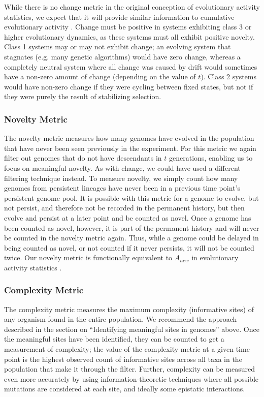 \documentclass[letterpaper]{article}
\begin{document}
While there is no change metric in the original conception of evolutionary activity statistics, we expect that it will provide similar information to cumulative evolutionary activity \citep{bedau_comparison_1997}. Change must be positive in systems exhibiting class 3 or higher evolutionary dynamics, as these systems must all exhibit positive novelty. Class 1 systems may or may not exhibit change; an evolving system that stagnates (e.g. many genetic algorithms) would have zero change, whereas a completely neutral system where all change was caused by drift would sometimes have a non-zero amount of change (depending on the value of $t$). Class 2 systems would have non-zero change if they were cycling between fixed states, but not if they were purely the result of stabilizing selection.

\subsubsection{Novelty Metric}
The novelty metric measures how many genomes have evolved in the population that have never been seen previously in the experiment. For this metric we again filter out genomes that do not have descendants in $t$ generations, enabling us to focus on meaningful novelty. As with change, we could have used a different filtering technique instead. To measure novelty, we simply count how many genomes from persistent lineages have never been in a previous time point’s persistent genome pool. It is possible with this metric for a genome to evolve, but not persist, and therefore not be recorded in the permanent history, but then evolve and persist at a later point and be counted as novel. Once a genome has been counted as novel, however, it is part of the permanent history and will never be counted in the novelty metric again. Thus, while a genome could be delayed in being counted as novel, or not counted if it never persists, it will not be counted twice. Our novelty metric is functionally equivalent to $A_{new}$ in evolutionary activity statistics \citep{bedau_comparison_1997}.    

\subsubsection{Complexity Metric}
The complexity metric measures the maximum complexity (informative sites) of any organism found in the entire population. We recommend the approach described in the section on  ``Identifying meaningful sites in genomes'' above. Once the meaningful sites have been identified, they can be counted to get a measurement of complexity; the value of the complexity metric at a given time point is the highest observed count of informative sites across all taxa in the population that make it through the filter. Further, complexity can be measured even more accurately by using information-theoretic techniques where all possible mutations are considered at each site, and ideally some epistatic interactions.
\end{document}
